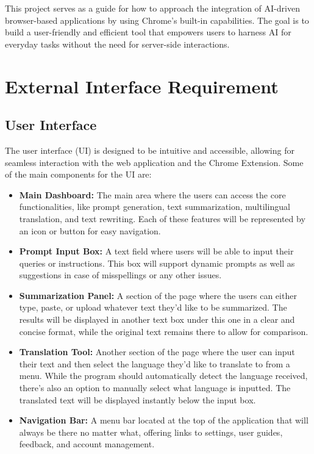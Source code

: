 \documentclass{article}
\begin{document}
This project serves as a guide for how to approach the integration of AI-driven browser-based applications by using Chrome’s built-in capabilities. The goal is to build a user-friendly and efficient tool that empowers users to harness AI for everyday tasks without the need for server-side interactions.

\section{External Interface Requirement}
\subsection{User Interface}
The user interface (UI) is designed to be intuitive and accessible, allowing for seamless interaction with the web application and the Chrome Extension. Some of the main components for the UI are:

\begin{itemize}
    \item \textbf{Main Dashboard:} The main area where the users can access the core functionalities, like prompt generation, text summarization, multilingual translation, and text rewriting. Each of these features will be represented by an icon or button for easy navigation.
    \item \textbf{Prompt Input Box:} A text field where users will be able to input their queries or instructions. This box will support dynamic prompts as well as suggestions in case of misspellings or any other issues.
    \item \textbf{Summarization Panel:} A section of the page where the users can either type, paste, or upload whatever text they'd like to be summarized. The results will be displayed in another text box under this one in a clear and concise format, while the original text remains there to allow for comparison.
    \item \textbf{Translation Tool:} Another section of the page where the user can input their text and then select the language they'd like to translate to from a menu. While the program should automatically detect the language received, there's also an option to manually select what language is inputted. The translated text will be displayed instantly below the input box.
    \item \textbf{Navigation Bar:} A menu bar located at the top of the application that will always be there no matter what, offering links to settings, user guides, feedback, and account management.
\end{itemize}
\end{document}
